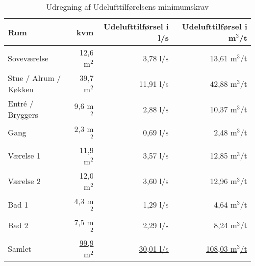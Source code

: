 \begin{table}[h!]
     \begin{center}
        \begin{tabular}{|l|r|r|r|}
            \hline
            Rum & kvm & Udelufttilførsel i l/s & Udelufttilførsel i m$^3$/t \\
            \hline
            Soveværelse       & 12,6 m$^2$ & 3,78 l/s & 13,61 m$^3$/t\\
            Stue / Alrum / Køkken & 39,7 m$^2$ & 11,91 l/s & 42,88 m$^3$/t\\
            Entré / Bryggers  & 9,6 m$^2$ & 2,88 l/s & 10,37 m$^3$/t\\
            Gang              & 2,3 m$^2$ & 0,69 l/s & 2,48 m$^3$/t\\
            Værelse 1         & 11,9 m$^2$ & 3,57 l/s & 12,85 m$^3$/t\\
            Værelse 2         & 12,0 m$^2$ & 3,60 l/s & 12,96 m$^3$/t\\
            Bad 1             & 4,3 m$^2$ & 1,29 l/s & 4,64 m$^3$/t\\
            Bad 2             & 7,5 m$^2$ & 2,29 l/s & 8,24 m$^3$/t\\
            \hline
            \hline
            Samlet & \underline{99,9 m$^2$} & \underline{30,01 l/s} & \underline{108,03 m$^3$/t} \\
            \hline
        \end{tabular}
    \end{center}
    \caption{Udregning af Udelufttilførelsens minimumskrav}
    \label{table:samregn_vent_ind}
\end{table}

